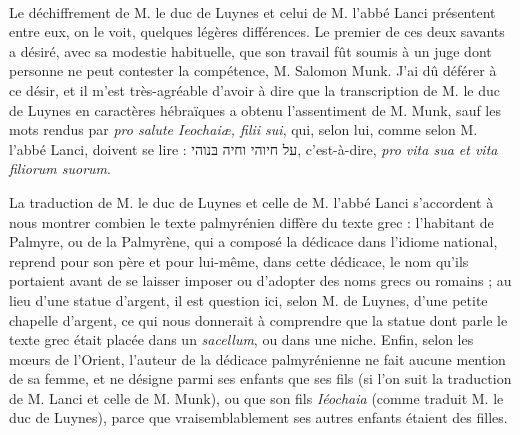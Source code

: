 \documentclass{article}
\begin{document}
\paragraph{}
Le déchiffrement de M. le duc de Luynes et celui de M. l'abbé Lanci présentent entre eux, on le voit, quelques légères différences. Le premier de ces deux savants a désiré, avec sa modestie habituelle, que son travail fût soumis à un juge dont personne ne peut contester la compétence, M. Salomon Munk. J'ai dû déférer à ce désir, et il m'est très-agréable d'avoir à dire que la transcription de M. le duc de Luynes en caractères hébraïques a obtenu l'assentiment de M. Munk, sauf les mots rendus par \emph{pro salute Ieochaiæ, filii sui}, qui, selon lui, comme selon M. l'abbé Lanci, doivent se lire : \texthebrew{על חיוהי וחיה בּנוהי}, c'est-à-dire, \emph{pro vita sua et vita filiorum suorum}.

La traduction de M. le duc de Luynes et celle de M. l'abbé Lanci s'accordent à nous montrer combien le texte palmyrénien diffère du texte grec : l'habitant de Palmyre, ou de la Palmyrène, qui a composé la dédicace dans l'idiome national, reprend pour son père et pour lui-même, dans cette dédicace, le nom qu'ils portaient avant de se laisser imposer ou d'adopter des noms grecs ou romains ; au lieu d'une statue d'argent, il est question ici, selon M. de Luynes, d'une petite chapelle d'argent, ce qui nous donnerait à comprendre que la statue dont parle le texte grec était placée dans un \emph{sacellum}, ou dans une niche. Enfin, selon les mœurs de l'Orient, l'auteur de la dédicace palmyrénienne ne fait aucune mention de sa femme, et ne désigne parmi ses enfants que ses fils (si l'on suit la traduction de M. Lanci et celle de M. Munk), ou que son fils \emph{Iéochaia} (comme traduit M. le duc de Luynes), parce que vraisemblablement ses autres enfants étaient des filles.
\end{document}
